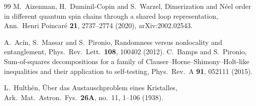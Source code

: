 \documentclass[10pt,a4paper]{article}
\theoremstyle{remark}
\begin{document}
\begin{thebibliography}{99}
 M.~Aizenman, H.~Duminil-Copin and S.~Warzel,
Dimerization and N\'eel order in different quantum spin chains
through a shared loop representation, Ann.\ Henri Poincar\'e
\textbf{21}, 2737--2774 (2020), arXiv:2002.02543.

 A.~Ac\'in, S.~Massar and S.~Pironio, Randomness versus
nonlocality and entanglement, Phys.\ Rev.\ Lett.\ \textbf{108}, 100402 (2012).
 C.~Bamps and S.~Pironio, Sum-of-squares decompositions for a
family of Clauser--Horne--Shimony--Holt-like inequalities and their application
to self-testing, Phys.\ Rev.\ A \textbf{91}, 052111 (2015).

 L.~Hulth\'en, \"Uber das Austauschproblem eines
Kristalles, Ark.\ Mat.\ Astron.\ Fys.\ \textbf{26A}, no.~11,
1--106 (1938).

\end{thebibliography}
\end{document}

